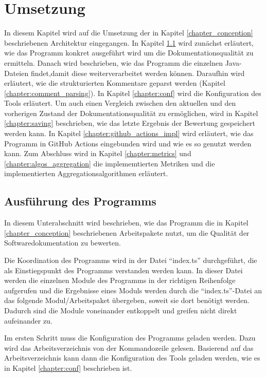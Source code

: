 
\begingroup
\renewcommand{\cleardoublepage}{} %
\renewcommand{\clearpage}{}
\chapter{Umsetzung}\label{chapter:program}
\endgroup
In diesem Kapitel wird auf die Umsetzung der in Kapitel \ref{chapter_conception} beschriebenen Architektur eingegangen. In Kapitel \ref{chapter:tool_running} wird zunächst erläutert, wie das Programm konkret ausgeführt wird um die Dokumentationsqualität zu ermitteln. Danach wird beschrieben, wie das Programm die einzelnen Java-Dateien findet,damit diese weiterverarbeitet werden können.  Daraufhin wird erläutert, wie die strukturierten Kommentare geparst werden (Kapitel \ref{chapter:comment_parsing}).  In Kapitel \ref{chapter:conf} wird die Konfiguration des Tools erläutert. Um auch einen Vergleich zwischen den aktuellen und den vorherigen Zustand der Dokumentationsqualität zu ermöglichen, wird in Kapitel \ref{chapter:saving} beschrieben, wie das letzte Ergebnis der Bewertung gespeichert werden kann. In Kapitel \ref{chapter:github_actions_impl} wird erläutert, wie das Programm in GitHub Actions eingebunden wird und wie es so genutzt werden kann. Zum Abschluss wird in Kapitel \ref{chapter:metrics} und \ref{chapter:algos_aggregation} die implememtierten Metriken und die implementierten Aggregationsalgorithmen erläutert. 


\hfill
\section{Ausführung des Programms}\label{chapter:tool_running}
In diesem Unterabschnitt wird beschrieben, wie das Programm die in Kapitel \ref{chapter_conception}
beschriebenen Arbeitspakete nutzt, um die Qualität der Softwaredokumentation zu bewerten. 

Die Koordination des Programms wird in der Datei \enquote{index.ts} durchgeführt, die als Einstiegspunkt des Programms verstanden werden kann. In dieser Datei werden die einzelnen Module des Programms in der richtigen Reihenfolge aufgerufen und die Ergebnisse eines Moduls werden durch die \enquote{index.ts}-Datei an das folgende Modul/Arbeitspaket übergeben, soweit sie dort benötigt werden. Dadurch sind die Module voneinander entkoppelt und greifen nicht direkt aufeinander zu. 

Im ersten Schritt  muss die Konfiguration des Programms geladen werden. Dazu wird das Arbeitsverzeichnis von der Kommandozeile gelesen. Basierend auf das Arbeitsverzeichnis kann dann die Konfiguration des Tools geladen werden, wie es in Kapitel \ref{chapter:conf} beschrieben ist.  

